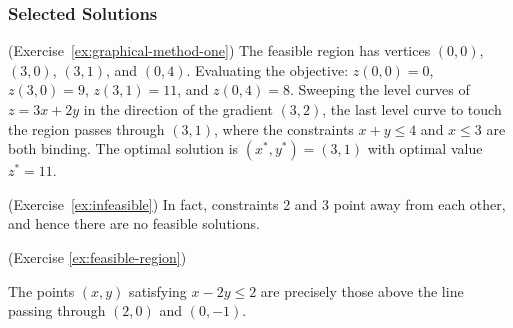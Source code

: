 %



\subsubsection*{Selected Solutions}
\label{solutions}

\begin{solution}(Exercise~\ref{ex:graphical-method-one})
The feasible region has vertices $(0,0)$, $(3,0)$, $(3,1)$, and $(0,4)$. Evaluating the objective: $z(0,0)=0$, $z(3,0)=9$, $z(3,1)=11$, and $z(0,4)=8$. Sweeping the level curves of $z = 3x+2y$ in the direction of the gradient $(3,2)$, the last level curve to touch the region passes through $(3,1)$, where the constraints $x+y\leq 4$ and $x\leq 3$ are both binding. The optimal solution is $(x^*,y^*) = (3,1)$ with optimal value $z^* = 11$.
\end{solution}

\begin{solution}(Exercise~\ref{ex:infeasible})
In fact, constraints 2 and 3 point away from each other, and hence there are no feasible solutions.
\end{solution}

\begin{solution}(Exercise \ref{ex:feasible-region})

The points \((x,y)\) satisfying \(x-2y \leq 2\) are precisely those
above the line passing through \((2,0)\) and \((0,-1)\).
\end{solution}


